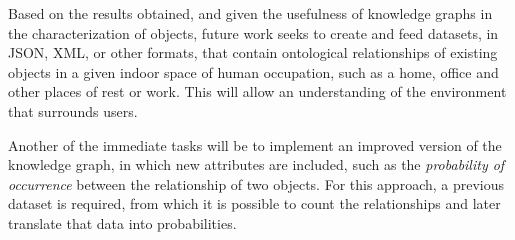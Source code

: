 Based on the results obtained, and given the usefulness of knowledge graphs in the characterization of objects, future work seeks to create and feed datasets, in JSON, XML, or other formats, that contain ontological relationships of existing objects in a given indoor space of human occupation, such as a home, office and other places of rest or work. This will allow an understanding of the environment that surrounds users.

Another of the immediate tasks will be to implement an improved version of the knowledge graph, in which new attributes are included, such as the \textit{probability of occurrence} between the relationship of two objects. For this approach, a previous dataset is required, from which it is possible to count the relationships and later translate that data into probabilities.